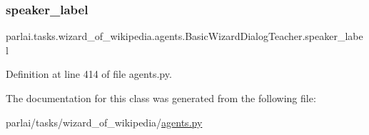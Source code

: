 \subsubsection{\texorpdfstring{speaker\+\_\+label}{speaker\_label}}
{\footnotesize\ttfamily parlai.\+tasks.\+wizard\+\_\+of\+\_\+wikipedia.\+agents.\+Basic\+Wizard\+Dialog\+Teacher.\+speaker\+\_\+label}



Definition at line 414 of file agents.\+py.



The documentation for this class was generated from the following file\+:\begin{DoxyCompactItemize}
\item 
parlai/tasks/wizard\+\_\+of\+\_\+wikipedia/\hyperlink{parlai_2tasks_2wizard__of__wikipedia_2agents_8py}{agents.\+py}\end{DoxyCompactItemize}
